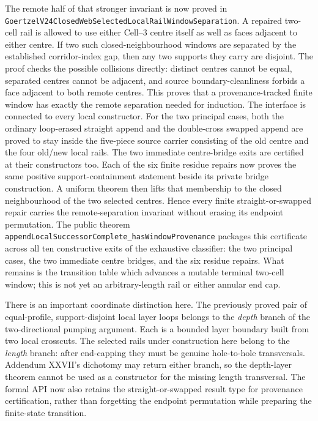 \documentclass[11pt]{article}
\theoremstyle{definition}
\begin{document}
The remote half of that stronger invariant is now proved in
\texttt{GoertzelV24ClosedWebSelectedLocalRailWindowSeparation}.  A repaired
two-cell rail is allowed to use either Cell--3 centre itself as well as faces
adjacent to either centre.  If two such closed-neighbourhood windows are
separated by the established corridor-index gap, then any two supports they
carry are disjoint.  The proof checks the possible collisions directly:
distinct centres cannot be equal, separated centres cannot be adjacent, and
source boundary-cleanliness forbids a face adjacent to both remote centres.
This proves that a provenance-tracked finite window has exactly the remote
separation needed for induction.  The interface is connected to every local
constructor.  For the two principal cases,
both the ordinary loop-erased straight append and the double-cross swapped
append are proved to stay inside the five-piece source carrier consisting of
the old centre and the four old/new local rails.  The two immediate
centre-bridge exits are certified at their constructors too.  Each of the six finite
residue repairs now proves the same positive support-containment statement
beside its private bridge construction.  A uniform theorem then lifts that
membership to the closed neighbourhood of the two selected centres.  Hence
every finite straight-or-swapped repair carries the remote-separation
invariant without erasing its endpoint permutation.  The public theorem
\texttt{appendLocalSuccessorComplete\_hasWindowProvenance} packages this
certificate across all ten constructive exits of the exhaustive classifier:
the two principal cases, the two immediate centre bridges, and the six
residue repairs.  What remains is the transition table which advances a
mutable terminal two-cell window; this is not yet an arbitrary-length rail or
either annular end cap.

There is an important coordinate distinction here.  The previously proved
pair of equal-profile, support-disjoint local layer loops belongs to the
\emph{depth} branch of the two-directional pumping argument.  Each is a
bounded layer boundary built from two local crosscuts.  The selected rails
under construction here belong to the \emph{length} branch: after end-capping
they must be genuine hole-to-hole transversals.  Addendum XXVII's dichotomy
may return either branch, so the depth-layer theorem cannot be used as a
constructor for the missing length transversal.  The formal API now also
retains the straight-or-swapped result type for provenance certification,
rather than forgetting the endpoint permutation while preparing the
finite-state transition.
\end{document}
